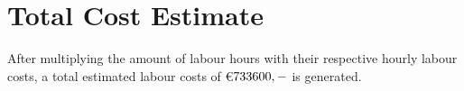 \section{Total Cost Estimate}\label{subsec:total_cost_estimate}
After multiplying the amount of labour hours with their respective hourly labour costs, a total estimated labour costs of \euro$733600,-$ is generated.


\ifx\homepath\overleafhome
\else
\fi

